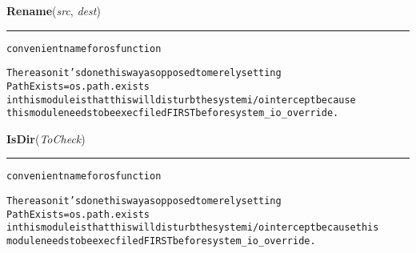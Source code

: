     \vspace{0.5ex}

\hspace{.8\funcindent}\begin{boxedminipage}{\funcwidth}

    \raggedright \textbf{Rename}(\textit{src}, \textit{dest})

    \vspace{-1.5ex}

    \rule{\textwidth}{0.5\fboxrule}
\setlength{\parskip}{2ex}
\begin{alltt}

convenient name for os function

The reason it's done this way as opposed to merely setting 
        PathExists = os.path.exists
in this module is that this will disturb the system i/o intercept because
this module needs to be execfiled FIRST before system\_io\_override. 
\end{alltt}

\setlength{\parskip}{1ex}
    \end{boxedminipage}

    \label{System:Utils:IsDir}

    \vspace{0.5ex}

\hspace{.8\funcindent}\begin{boxedminipage}{\funcwidth}

    \raggedright \textbf{IsDir}(\textit{ToCheck})

    \vspace{-1.5ex}

    \rule{\textwidth}{0.5\fboxrule}
\setlength{\parskip}{2ex}
\begin{alltt}

convenient name for os function

The reason it's done this way as opposed to merely setting 
        PathExists = os.path.exists
in this module is that this will disturb the system i/o intercept because this
module needs to be execfiled FIRST before system\_io\_override. 
\end{alltt}

\setlength{\parskip}{1ex}
    \end{boxedminipage}

    \label{System:Utils:IsFile}

